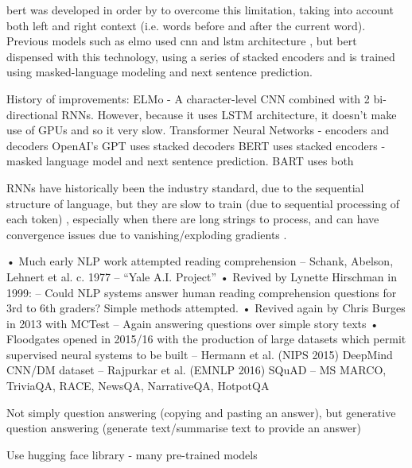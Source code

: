 \acrfull{bert} was developed in order by \citet{devlin2019bert} to overcome this limitation, taking into account both left and right context (i.e. words before and after the current word). Previous models such as \acrshort{elmo} used \acrshort{cnn} and \acrshort{lstm} architecture \citep{peters2018deep}, but \acrshort{bert} dispensed with this technology, using a series of stacked encoders and is trained using masked-language modeling and next sentence prediction. %



History of improvements: 
ELMo - A character-level CNN combined with 2 bi-directional RNNs. However, because it uses LSTM architecture, it doesn't make use of GPUs and so it very slow.
Transformer Neural Networks - encoders and decoders
OpenAI's GPT uses stacked decoders
BERT uses stacked encoders - masked language model and next sentence prediction.
BART uses both

RNNs have historically been the industry standard, due to the sequential structure of language, but they are slow to train (due to sequential processing of each token) \citep{vaswani2017attention}, especially when there are long strings to process, and can have convergence issues due to vanishing/exploding gradients \citep{Lipton}.

• Much early NLP work attempted reading comprehension
– Schank, Abelson, Lehnert et al. c. 1977 – “Yale A.I. Project”
• Revived by Lynette Hirschman in 1999:
– Could NLP systems answer human reading comprehension questions for 
3rd to 6th graders? Simple methods attempted.
• Revived again by Chris Burges in 2013 with MCTest
– Again answering questions over simple story texts
• Floodgates opened in 2015/16 with the production of large datasets which 
permit supervised neural systems to be built
– Hermann et al. (NIPS 2015) DeepMind CNN/DM dataset
– Rajpurkar et al. (EMNLP 2016) SQuAD
– MS MARCO, TriviaQA, RACE, NewsQA, NarrativeQA, HotpotQA
%

Not simply question answering (copying and pasting an answer), but generative question answering (generate text/summarise text to provide an answer)

Use hugging face library - many pre-trained models

